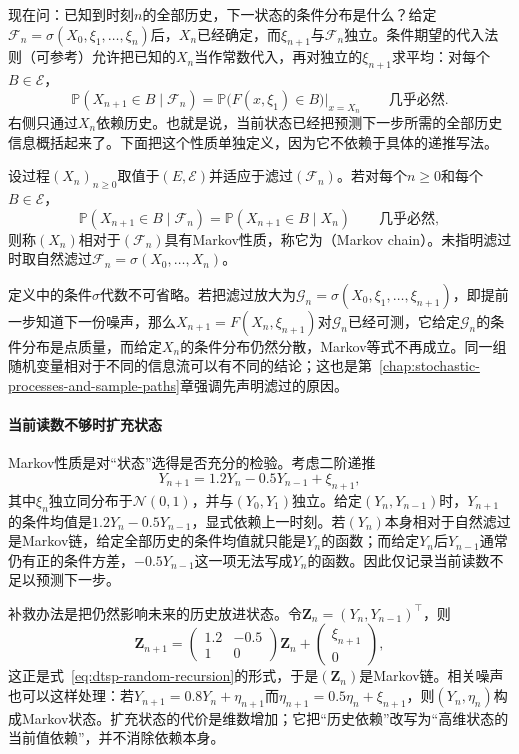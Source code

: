 现在问：已知到时刻$n$的全部历史，下一状态的条件分布是什么？给定$\mathcal F_n=\sigma(X_0,\xi_1,\ldots,\xi_n)$后，$X_n$已经确定，而$\xi_{n+1}$与$\mathcal F_n$独立。条件期望的代入法则（可参考）允许把已知的$X_n$当作常数代入，再对独立的$\xi_{n+1}$求平均：对每个$B\in\mathcal E$，
\begin{equation}
  \mathbb P(X_{n+1}\in B\mid\mathcal F_n)
  =\mathbb P\bigl(F(x,\xi_{1})\in B\bigr)\big|_{x=X_n}
  \qquad\text{几乎必然}.
  \label{eq:dtsp-recursion-conditional-law}
\end{equation}
右侧只通过$X_n$依赖历史。也就是说，当前状态已经把预测下一步所需的全部历史信息概括起来了。下面把这个性质单独定义，因为它不依赖于具体的递推写法。

\begin{definition}[Markov性质]
  \label{def:dtsp-markov-property}
  设过程$(X_n)_{n\geq0}$取值于$(E,\mathcal E)$并适应于滤过$(\mathcal F_n)$。若对每个$n\geq0$和每个$B\in\mathcal E$，
  \[
    \mathbb P(X_{n+1}\in B\mid\mathcal F_n)=\mathbb P(X_{n+1}\in B\mid X_n)\qquad\text{几乎必然},
  \]
  则称$(X_n)$相对于$(\mathcal F_n)$具有Markov性质，称它为（Markov chain）。未指明滤过时取自然滤过$\mathcal F_n=\sigma(X_0,\ldots,X_n)$。
\end{definition}

定义中的条件$\sigma$代数不可省略。若把滤过放大为$\mathcal G_n=\sigma(X_0,\xi_1,\ldots,\xi_{n+1})$，即提前一步知道下一份噪声，那么$X_{n+1}=F(X_n,\xi_{n+1})$对$\mathcal G_n$已经可测，它给定$\mathcal G_n$的条件分布是点质量，而给定$X_n$的条件分布仍然分散，Markov等式不再成立。同一组随机变量相对于不同的信息流可以有不同的结论；这也是第~\ref{chap:stochastic-processes-and-sample-paths}章强调先声明滤过的原因。

\paragraph{当前读数不够时扩充状态}
Markov性质是对“状态”选得是否充分的检验。考虑二阶递推
\[
  Y_{n+1}=1.2Y_n-0.5Y_{n-1}+\xi_{n+1},
\]
其中$\xi_n$独立同分布于$\mathcal N(0,1)$，并与$(Y_0,Y_1)$独立。给定$(Y_n,Y_{n-1})$时，$Y_{n+1}$的条件均值是$1.2Y_n-0.5Y_{n-1}$，显式依赖上一时刻。若$(Y_n)$本身相对于自然滤过是Markov链，给定全部历史的条件均值就只能是$Y_n$的函数；而给定$Y_n$后$Y_{n-1}$通常仍有正的条件方差，$-0.5Y_{n-1}$这一项无法写成$Y_n$的函数。因此仅记录当前读数不足以预测下一步。

补救办法是把仍然影响未来的历史放进状态。令$\bm Z_n=(Y_n,Y_{n-1})^{\top}$，则
\[
  \bm Z_{n+1}=
  \begin{pmatrix}1.2&-0.5\\1&0\end{pmatrix}\bm Z_n
  +\begin{pmatrix}\xi_{n+1}\\0\end{pmatrix},
\]
这正是式~\eqref{eq:dtsp-random-recursion}的形式，于是$(\bm Z_n)$是Markov链。相关噪声也可以这样处理：若$Y_{n+1}=0.8Y_n+\eta_{n+1}$而$\eta_{n+1}=0.5\eta_n+\xi_{n+1}$，则$(Y_n,\eta_n)$构成Markov状态。扩充状态的代价是维数增加；它把“历史依赖”改写为“高维状态的当前值依赖”，并不消除依赖本身。

